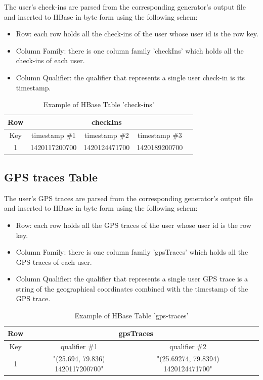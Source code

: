 The user's check-ins are parsed from the corresponding generator's output file and inserted to HBase in byte form using the following schem:

\begin{itemize}
 \item Row: each row holds all the check-ins of the user whose user id is the row key.
 \item Column Family: there is one column family 'checkIns' which holds all the check-ins of each user.
 \item Column Qualifier: the qualifier that represents a single user check-in is its timestamp.
\end{itemize}

\begin{table}[H]
\begin{center}
\begin{tabular}{|c|c|c|c|c|}
 \hline
 Row & \multicolumn{3}{|c|}{checkIns} \\
 \hline
 Key & timestamp \#1 & timestamp \#2 & timestamp \#3 \\
 \hline
 1 & 1420117200700 & 1420124471700 & 1420189200700 \\ \hline 
\end{tabular}
\end{center}
\caption{Example of HBase Table 'check-ins'}
\end{table}

\subsection{GPS traces Table}

The user's GPS traces are parsed from the corresponding generator's output file and inserted to HBase in byte form using the following schem:

\begin{itemize}
 \item Row: each row holds all the GPS traces of the user whose user id is the row key.
 \item Column Family: there is one column family 'gpsTraces' which holds all the GPS traces of each user.
 \item Column Qualifier: the qualifier that represents a single user GPS trace is a string of the geographical coordinates combined with the timestamp of the GPS trace.
\end{itemize}

\begin{table}[H]
\begin{center}
\begin{tabular}{|c|c|c|c|c|}
 \hline
 Row & \multicolumn{2}{|c|}{gpsTraces} \\
 \hline
 Key & qualifier \#1 & qualifier \#2\\
 \hline
 1 & "(25.694, 79.836) 1420117200700" & "(25.69274, 79.8394) 1420124471700" \\ \hline 
\end{tabular}
\end{center}
\caption{Example of HBase Table 'gps-traces'}
\end{table}

